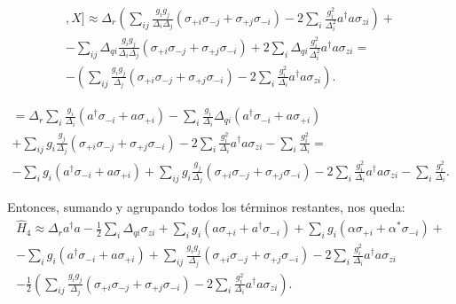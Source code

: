 \begin{multline}
[[H,X],X] \approx \Delta_r \left(\sum\limits_{ij} \frac{g_i g_j}{\Delta_i \Delta_j} \left(\sigma_{+i} \sigma_{-j} + \sigma_{+j} \sigma_{-i}\right) -
2 \sum\limits_{i} \frac{g_i^2}{\Delta_i^2} a^\dagger a \sigma_{zi} \right) + \\
- \sum\limits_{ij} \Delta_{qi}  \frac{g_i g_j}{\Delta_i \Delta_j} \left(\sigma_{+i} \sigma_{-j} + \sigma_{+j} \sigma_{-i}\right) +
2 \sum\limits_{i} \Delta_{qi} \frac{g_i^2}{\Delta_i^2} a^\dagger a \sigma_{zi} = \\
- \left(\sum\limits_{ij} \frac{g_i g_j}{\Delta_j} \left(\sigma_{+i} \sigma_{-j} + \sigma_{+j} \sigma_{-i}\right) -
2 \sum\limits_{i} \frac{g_i^2}{\Delta_i} a^\dagger a \sigma_{zi} \right) .
\end{multline}

\begin{multline}
    [H,X] = \Delta_r \sum\limits_i \frac{g_i} {\Delta_i} (a^\dagger \sigma_{-i} + a \sigma_{+i}) - \sum\limits_i \frac{g_i} {\Delta_i} \Delta_{qi} (a^\dagger \sigma_{-i} + a \sigma_{+i}) \\
+ \sum\limits_{ij} g_i \frac{g_j}{\Delta_j} \left(\sigma_{+i} \sigma_{-j} + \sigma_{+j} \sigma_{-i}\right) - 2 \sum\limits_{i} \frac{g_i^2}{\Delta_i} a^\dagger a \sigma_{zi} - \sum\limits_i \frac{g_i^2} {\Delta_i} = \\
- \sum\limits_i g_i (a^\dagger \sigma_{-i} + a \sigma_{+i}) + \sum\limits_{ij} g_i \frac{g_j}{\Delta_j} \left(\sigma_{+i} \sigma_{-j} + \sigma_{+j} \sigma_{-i}\right) - 2 \sum\limits_{i} \frac{g_i^2}{\Delta_i} a^\dagger a \sigma_{zi} - \sum\limits_i \frac{g_i^2} {\Delta_i} .
\end{multline}

Entonces, sumando y agrupando todos los términos restantes, nos queda:
\begin{multline}
\hat{H}_4 \approx \Delta_r a^\dagger a - \frac{1}{2} \sum\limits_i \Delta_{qi} \sigma_{zi} + \sum\limits_i g_i (a \sigma_{+i} + a^\dagger \sigma_{-i}) + \sum\limits_i g_i (\alpha \sigma_{+i} + \alpha^* \sigma_{-i}) + \\
- \sum\limits_i g_i (a^\dagger \sigma_{-i} + a \sigma_{+i}) + \sum\limits_{ij} \frac{g_i g_j}{\Delta_j} \left(\sigma_{+i} \sigma_{-j} + \sigma_{+j} \sigma_{-i}\right) - 2 \sum\limits_{i} \frac{g_i^2}{\Delta_i} a^\dagger a \sigma_{zi} \\
- \frac{1}{2} \left(\sum\limits_{ij} \frac{g_i g_j}{\Delta_j} \left(\sigma_{+i} \sigma_{-j} + \sigma_{+j} \sigma_{-i}\right) -
2 \sum\limits_{i} \frac{g_i^2}{\Delta_i} a^\dagger a \sigma_{zi} \right) .
\end{multline}

